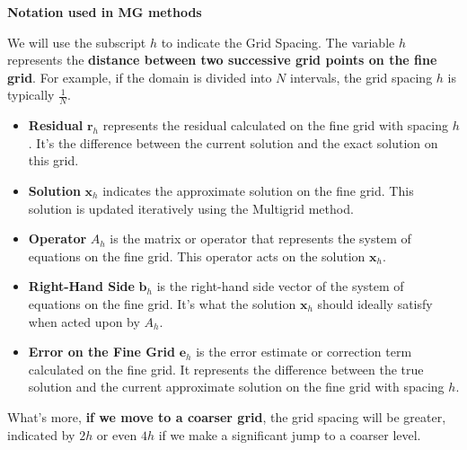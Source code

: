 \begin{flushleft}
    \textcolor{Green3}{ \textbf{Notation used in MG methods}}
\end{flushleft}
We will use the subscript $h$ to indicate the Grid Spacing. The variable $h$ represents the \textbf{distance between two successive grid points on the fine grid}. For example, if the domain is divided into $N$ intervals, the grid spacing $h$ is typically $\frac{1}{N}$.
\begin{itemize}
    \item \textbf{Residual} $\mathbf{r}_{h}$ represents the residual calculated on the fine grid with spacing $h$. It's the difference between the current solution and the exact solution on this grid.

    \item \textbf{Solution} $\mathbf{x}_{h}$ indicates the approximate solution on the fine grid. This solution is updated iteratively using the Multigrid method.
    
    \item \textbf{Operator} $A_{h}$ is the matrix or operator that represents the system of equations on the fine grid. This operator acts on the solution $\mathbf{x}_{h}$.
    
    \item \textbf{Right-Hand Side} $\mathbf{b}_{h}$ is the right-hand side vector of the system of equations on the fine grid. It's what the solution $\mathbf{x}_{h}$ should ideally satisfy when acted upon by $A_{h}$.
    
    \item \textbf{Error on the Fine Grid} $\mathbf{e}_{h}$ is the error estimate or correction term calculated on the fine grid. It represents the difference between the true solution and the current approximate solution on the fine grid with spacing $h$.
\end{itemize}
What's more, \textbf{if we move to a coarser grid}, the grid spacing will be greater, indicated by $2h$ or even $4h$ if we make a significant jump to a coarser level.